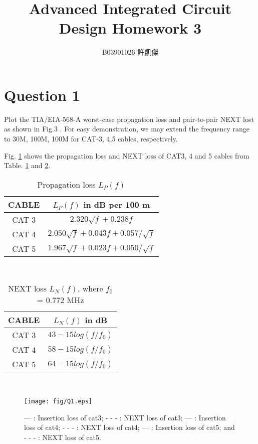 \documentclass[journal]{IEEEtran}
\begin{document}
\title{Advanced Integrated Circuit Design Homework 3} 

\author{B03901026 許凱傑}

 

\maketitle 

\baselineskip 0.3in

\section{Question 1}
Plot the TIA/EIA-568-A worst-case propagation loss and pair-to-pair NEXT lost as shown in Fig.3 \cite{REF1}.
For easy demonstration, we may extend the frequency range to 30M, 100M, 100M for CAT-3, 4,5 cables, respectively.

Fig. \ref{fig1} shows the propagation loss and NEXT loss of CAT3, 4 and 5 cables from Table. \ref{tab1} and \ref{tab2}.

\begin{table}[!htbp]
\centering
\caption{Propagation loss $L_P(f)$} 
\begin{tabular}{| c | c |}
\hline	
CABLE & $L_P(f)$ in dB per 100 m \\
\hline
CAT 3 & $2.320 \sqrt{f} + 0.238 f$ \\
\hline
CAT 4 & $2.050 \sqrt{f} + 0.043 f + 0.057 / \sqrt{f}$ \\
\hline
CAT 5 & $1.967 \sqrt{f} + 0.023 f + 0.050 / \sqrt{f}$ \\
\hline
\end{tabular}
\\
\label{tab1}
\end{table}

\begin{table}[!htbp]
\centering
\caption{NEXT loss $L_N(f)$, where $f_0$ = 0.772 MHz} 
\begin{tabular}{| c | c |}
\hline	
CABLE & $L_N(f)$ in dB \\
\hline
CAT 3 & $43 - 15 log(f/f_0)$ \\
\hline
CAT 4 & $58 - 15 log(f/f_0)$ \\
\hline
CAT 5 & $64 - 15 log(f/f_0)$ \\
\hline
\end{tabular}
\\
\label{tab2}
\end{table}

\begin{figure}[!htbp]
\center
\texttt{[image: fig/Q1.eps]}
\caption{
{\color{red} ---} : Insertion loss of cat3;
{\color{red} - - -} : NEXT loss of cat3;
{\color{blue} ---} : Insertion loss of cat4;
{\color{blue} - - -} : NEXT loss of cat4;
--- : Insertion loss of cat5;
and - - - : NEXT loss of cat5.
}
\label{fig1}
\end{figure}
\end{document}
